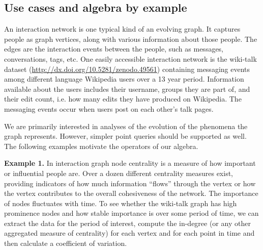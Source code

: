\subsection{Use cases and algebra by example}
\label{sec:cases}

An interaction network is one typical kind of an evolving graph.  It
captures people as graph vertices, along with various information
about those people.  The edges are the interaction events between the
people, such as messages, conversations, tags, etc.  One easily
accessible interaction network is the wiki-talk dataset
(\url{http://dx.doi.org/10.5281/zenodo.49561}) containing messaging
events among different language Wikipedia users over a 13 year period.
Information available about the users includes their username, groups
they are part of, and their edit count, i.e. how many edits they have
produced on Wikipedia.  The messaging events occur when users post on
each other's talk pages.

We are primarily interested in analyses of the evolution of the
phenomena the graph represents.  However, simpler point queries should
be supported as well.  The following examples motivate the operators
of our algebra.

{\bf Example 1.}  In interaction graph node centrality is a measure
of how important or influential people are.  Over a dozen different
centrality measures exist, providing indicators of how much
information ``flows'' through the vertex or how the vertex contributes
to the overall cohesiveness of the network.  The importance of nodes
fluctuates with time.  To see whether the wiki-talk graph has high
prominence nodes and how stable importance is over some period of
time, we can extract the data for the period of interest, compute the
in-degree (or any other aggregated measure of centrality) for each
vertex and for each point in time and then calculate a coefficient of
variation.


